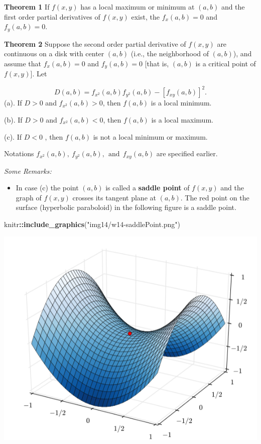 \documentclass[
]{book}
\newenvironment{Shaded}{\begin{snugshade}}{\end{snugshade}}
\newcommand{\FunctionTok}[1]{\textcolor[rgb]{0.13,0.29,0.53}{\textbf{#1}}}
\newcommand{\NormalTok}[1]{#1}
\newcommand{\SpecialCharTok}[1]{\textcolor[rgb]{0.81,0.36,0.00}{\textbf{#1}}}
\newcommand{\StringTok}[1]{\textcolor[rgb]{0.31,0.60,0.02}{#1}}
\providecommand{\tightlist}{%
  \setlength{\itemsep}{0pt}\setlength{\parskip}{0pt}}
\begin{document}
\textbf{Theorem 1} If \(f(x,y)\) has a local maximum or minimum at \((a,b)\) and
the first order partial derivatives of \(f(x,y)\) exist, the
\(f_x(a,b) = 0\) and \(f_y(a,b) = 0\).

\textbf{Theorem 2} Suppose the second order partial derivative of \(f(x,y)\)
are continuous on a disk with center \((a,b)\) (i.e., the neighborhood of
\((a,b)\)), and assume that \(f_x(a,b) = 0\) and \(f_y(a, b) = 0\) {[}that is,
\((a,b)\) is a critical point of \(f(x,y)\){]}. Let

\[
D(a, b) = f_{x^2}(a,b)f_{y^2}(a,b) - [f_{xy}(a,b)]^2.
\] (a). If \(D > 0\) and \(f_{x^2}(a,b) > 0\), then \(f(a, b)\) is a local
minimum.

(b). If \(D > 0\) and \(f_{x^2}(a,b) < 0\), then \(f(a, b)\) is a local
maximum.

(c). If \(D < 0\) , then \(f(a, b)\) is not a local minimum or maximum.

\hfill\break

Notations \(f_{x^2}(a,b), ~f_{y^2}(a,b), ~~\text{and}~~f_{xy}(a,b)\) are
specified earlier.

\emph{Some Remarks:}

\begin{itemize}
\tightlist
\item
  In case (c) the point \((a,b)\) is called a \textbf{saddle point} of
  \(f(x,y)\) and the graph of \(f(x,y)\) crosses its tangent plane at
  \((a,b)\). The red point on the surface (hyperbolic paraboloid) in the
  following figure is a saddle point.
\end{itemize}

\begin{Shaded}
\begin{Highlighting}[]
\NormalTok{knitr}\SpecialCharTok{::}\FunctionTok{include\_graphics}\NormalTok{(}\StringTok{"img14/w14{-}saddlePoint.png"}\NormalTok{)}
\end{Highlighting}
\end{Shaded}

\begin{center}\includegraphics[width=0.4\linewidth]{img14/w14-saddlePoint} \end{center}
\end{document}
